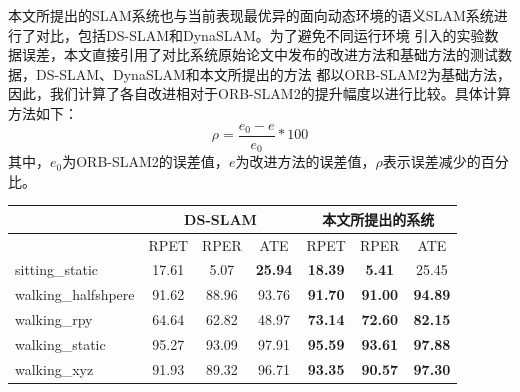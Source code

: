 本文所提出的SLAM系统也与当前表现最优异的面向动态环境的语义SLAM系统进行了对比，包括DS-SLAM和DynaSLAM。为了避免不同运行环境
引入的实验数据误差，本文直接引用了对比系统原始论文中发布的改进方法和基础方法的测试数据，DS-SLAM、DynaSLAM和本文所提出的方法
都以ORB-SLAM2为基础方法，因此，我们计算了各自改进相对于ORB-SLAM2的提升幅度以进行比较。具体计算方法如下：
$$\rho=\frac{e_{0}-e}{e_{0}}*100$$
其中，$e_{0}$为ORB-SLAM2的误差值，$e$为改进方法的误差值，$\rho$表示误差减少的百分比。
\begin{table}[!htbp]
    \label{tab:DSSLAM}
    \centering
    \footnotesize%
    \setlength{\tabcolsep}{8pt}%
    \renewcommand{\arraystretch}{1.3}%
    \begin{tabular}{l|ccc|ccc}
        \hline
        & \multicolumn{3}{c|}{DS-SLAM}                                       & \multicolumn{3}{c}{本文所提出的系统}                                    \\ \hline
        & RPET & RPER & ATE            & RPET         & RPER         & ATE            \\ \hline
sitting\_static     & 17.61                    & 5.07                  & \textbf{25.94} & \textbf{18.39}           & \textbf{5.41}         & 25.45          \\ \hline
walking\_halfshpere & 91.62                    & 88.96                 & 93.76          & \textbf{91.70}           & \textbf{91.00}        & \textbf{94.89} \\ \hline
walking\_rpy        & 64.64                    & 62.82                 & 48.97          & \textbf{73.14}           & \textbf{72.60}        & \textbf{82.15} \\ \hline
walking\_static     & 95.27                    & 93.09                 & 97.91          & \textbf{95.59}           & \textbf{93.61}        & \textbf{97.88} \\ \hline
walking\_xyz        & 91.93                    & 89.32                 & 96.71          & \textbf{93.35}           & \textbf{90.57}        & \textbf{97.30} \\ \hline
        \hline
    \end{tabular}
\end{table}


